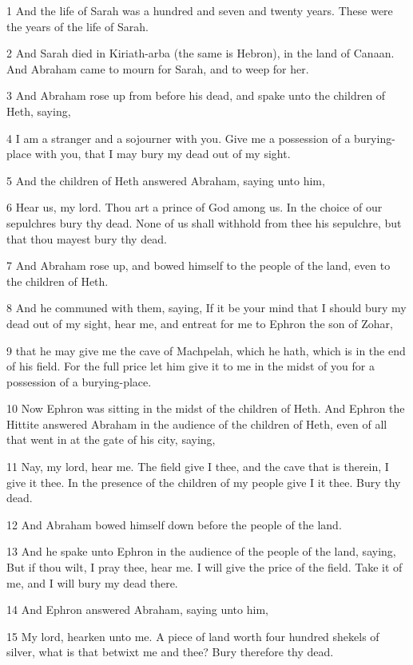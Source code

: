 \par 1 And the life of Sarah was a hundred and seven and twenty years. These were the years of the life of Sarah.
\par 2 And Sarah died in Kiriath-arba (the same is Hebron), in the land of Canaan. And Abraham came to mourn for Sarah, and to weep for her.
\par 3 And Abraham rose up from before his dead, and spake unto the children of Heth, saying,
\par 4 I am a stranger and a sojourner with you. Give me a possession of a burying-place with you, that I may bury my dead out of my sight.
\par 5 And the children of Heth answered Abraham, saying unto him,
\par 6 Hear us, my lord. Thou art a prince of God among us. In the choice of our sepulchres bury thy dead. None of us shall withhold from thee his sepulchre, but that thou mayest bury thy dead.
\par 7 And Abraham rose up, and bowed himself to the people of the land, even to the children of Heth.
\par 8 And he communed with them, saying, If it be your mind that I should bury my dead out of my sight, hear me, and entreat for me to Ephron the son of Zohar,
\par 9 that he may give me the cave of Machpelah, which he hath, which is in the end of his field. For the full price let him give it to me in the midst of you for a possession of a burying-place.
\par 10 Now Ephron was sitting in the midst of the children of Heth. And Ephron the Hittite answered Abraham in the audience of the children of Heth, even of all that went in at the gate of his city, saying,
\par 11 Nay, my lord, hear me. The field give I thee, and the cave that is therein, I give it thee. In the presence of the children of my people give I it thee. Bury thy dead.
\par 12 And Abraham bowed himself down before the people of the land.
\par 13 And he spake unto Ephron in the audience of the people of the land, saying, But if thou wilt, I pray thee, hear me. I will give the price of the field. Take it of me, and I will bury my dead there.
\par 14 And Ephron answered Abraham, saying unto him,
\par 15 My lord, hearken unto me. A piece of land worth four hundred shekels of silver, what is that betwixt me and thee? Bury therefore thy dead.
